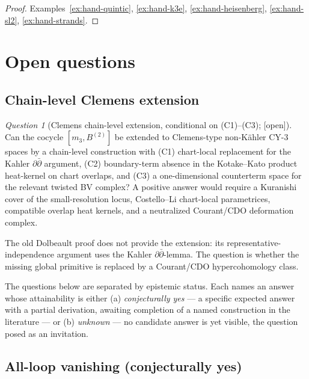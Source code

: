 \documentclass[11pt,reqno]{amsart}
\theoremstyle{plain}
\theoremstyle{definition}
\theoremstyle{remark}
\newtheorem{question}[theorem]{Question}
\providecommand{\ClaimStatusOpen}{\textnormal{[open]}}
\begin{document}
\begin{proof}
Examples~\ref{ex:hand-quintic}, \ref{ex:hand-k3e}, \ref{ex:hand-heisenberg}, \ref{ex:hand-sl2}, \ref{ex:hand-strands}.
\end{proof}

\section{Open questions}
\label{sec:open}

\subsection{Chain-level Clemens extension}

\begin{question}[Clemens chain-level extension, conditional on \textup{(C1)--(C3)}; \ClaimStatusOpen]
\label{thm:clemens-extension}
Can the cocycle $[m_3,B^{(2)}]$ be extended to Clemens-type
non-K\"ahler CY-$3$ spaces by a chain-level construction with
\textup{(C1)} chart-local replacement for the Kahler
$\partial\bar\partial$ argument, \textup{(C2)} boundary-term absence in
the Kotake--Kato product heat-kernel on chart overlaps, and
\textup{(C3)} a one-dimensional counterterm space for the relevant
twisted BV complex? A positive answer would require a Kuranishi cover
of the small-resolution locus, Costello--Li chart-local parametrices,
compatible overlap heat kernels, and a neutralized Courant/CDO
deformation complex.
\end{question}

The old Dolbeault proof does not provide the extension: its
representative-independence argument uses the Kahler
$\partial\bar\partial$-lemma. The question is whether the missing
global primitive is replaced by a Courant/CDO hypercohomology class.

The questions below are separated by epistemic status. Each names an answer whose attainability is either (a) \emph{conjecturally yes} --- a specific expected answer with a partial derivation, awaiting completion of a named construction in the literature --- or (b) \emph{unknown} --- no candidate answer is yet visible, the question posed as an invitation.

\subsection{All-loop vanishing (conjecturally yes)}
\end{document}
